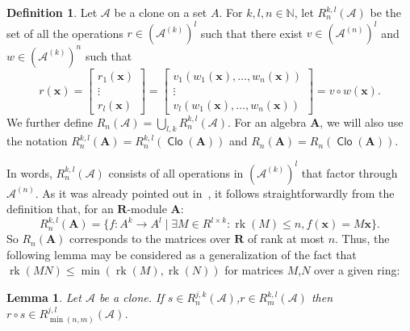 \documentclass[11pt]{amsart}
\theoremstyle{plain}
\newtheorem{lemma}[thm]{Lemma}
\theoremstyle{definition}
\newtheorem{definition}[thm]{Definition}
\newcommand{\N}{{\mathbb N}}
\newcommand{\alg}[1]{\mathbf{#1}}
\newcommand{\clone}[1]{\mathcal{#1}}
\newcommand{\algA}{\alg{A}}
\newcommand{\algR}{\alg{R}}
\newcommand{\cloA}{\clone{A}}
\renewcommand\vec{\mathbf}
\newcommand{\vx}{\vec{x}}
\DeclareMathOperator{\Clo}{\mathsf{Clo}}
\DeclareMathOperator{\rk}{rk}
\newcommand{\ste}[1]{\textcolor{green}{ #1}}
\begin{document}

\begin{definition}
Let $\cloA$ be a clone on a set $A$. For $k,l,n \in \N$, let $R_{n}^{k,l}(\cloA)$ be the set of all the operations $r \in (\cloA^{(k)})^l$ such that there exist $v \in (\cloA^{(n)})^l$ and $w \in (\cloA^{(k)})^n$ such that 
$$r(\vx) = \begin{bmatrix} r_1(\vx)\\ \vdots \\ r_l(\vx) \end{bmatrix} = \begin{bmatrix} v_1 (w_1(\vx), \ldots, w_n(\vx))\\ \vdots \\ v_l (w_1(\vx), \ldots, w_n(\vx)) \end{bmatrix} = v \circ w (\vx).$$
We further define $R_n(\cloA) = \bigcup_{l,k} R_{n}^{k,l}(\cloA)$. For an algebra $\algA$, we will also use the notation $R^{k,l}_n(\algA) = R^{k,l}_n(\Clo(\algA))$ and $R_n(\algA) = R_n(\Clo(\algA))$.
\end{definition}

In words, $R^{k,l}_n(\cloA)$ consists of all operations in $(\cloA^{(k)})^l$ that factor through $\cloA^{(n)}$. As it was already pointed out in~\cite{MW-clonoidsmodules}, it follows straightforwardly from the definition that, for an $\algR$-module $\algA$:
$$R_{n}^{k,l}(\algA) = \{ f \colon A^k \to  A^l \mid \exists M \in R^{l \times k} : \rk(M) \leq n, f(\vx) = M \vx\}.$$
So $R_{n}(\algA)$ corresponds to the matrices over $\algR$ of rank at most $n$. Thus, the following lemma may be considered as a generalization of the fact that $\rk(MN) \leq \min(\rk(M),\rk(N))$ for matrices $M$,$N$ over a given ring:
\begin{lemma} \label{lemma:rkprod}
Let $\cloA$ be a clone. If $s \in R_n^{j,k}(\cloA)$,$r \in R_m^{k,l}(\cloA)$ then $r \circ s \in R_{\min (n,m)}^{j,l}(\cloA)$.
\end{lemma}
\end{document}
